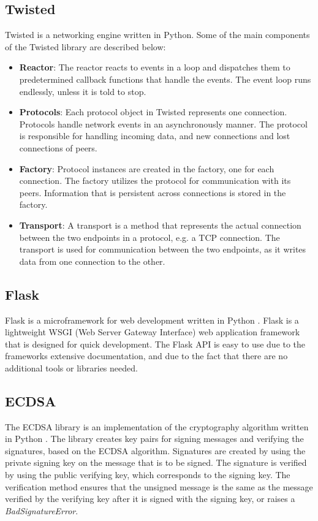 \subsection{Twisted}
Twisted \cite{twisted} is a networking engine written in Python.
Some of the main components of the Twisted library are described below:
\begin{itemize}
\item \textbf{Reactor}: The reactor reacts to events in a loop and dispatches them to predetermined callback functions that handle the events. The event loop runs endlessly, unless it is told to stop. 

\item \textbf{Protocols}: Each protocol object in Twisted represents one connection. Protocols handle network events in an asynchronously manner. The protocol is responsible for handling incoming data, and new connections and lost connections of peers.

\item \textbf{Factory}: Protocol instances are created in the factory, one for each connection. The factory utilizes the protocol for communication with its peers. Information that is persistent across connections is stored in the factory.

\item \textbf{Transport}: A transport is a method that represents the actual connection between the two endpoints in a protocol, e.g. a TCP connection. The transport is used for communication between the two endpoints, as it writes data from one connection to the other.
\end{itemize}

\subsection{Flask}
Flask is a microframework for web development written in Python \cite{flask}. Flask is a lightweight WSGI (Web Server Gateway Interface) web application framework that is  designed for quick development. The Flask API is easy to use due to the frameworks extensive documentation, and due to the fact that there are no additional tools or libraries needed.

\subsection{ECDSA}
The ECDSA library is an implementation of the cryptography algorithm written in Python \cite{ecdsa}. The library creates key pairs for signing messages and verifying the signatures, based on the ECDSA algorithm. Signatures are created by using the private signing key on the message that is to be signed. The signature is verified by using the public verifying key, which corresponds to the signing key. The verification method ensures that the unsigned message is the same as the message verified by the verifying key after it is signed with the signing key, or raises a \textit{BadSignatureError}.

